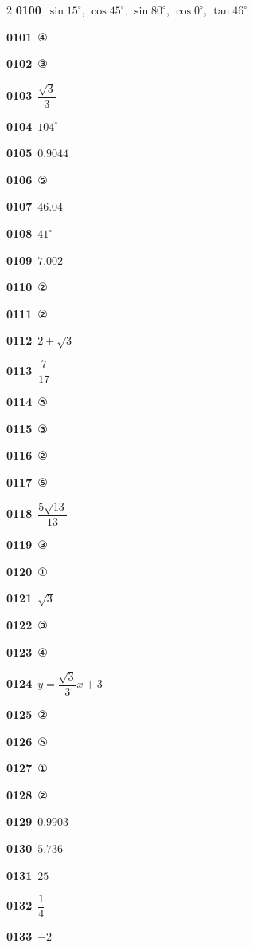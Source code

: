 \documentclass[10pt,a4paper]{article}
\begin{document}
\begin{multicols}{2}
\noindent\textbf{0100}\ $\sin 15^\circ$, $\cos 45^\circ$, $\sin 80^\circ$, $\cos 0^\circ$, $\tan 46^\circ$\par
\noindent\textbf{0101}\ ④\par
\noindent\textbf{0102}\ ③\par
\noindent\textbf{0103}\ $\dfrac{\sqrt{3}}{3}$\par
\noindent\textbf{0104}\ $104^\circ$\par
\noindent\textbf{0105}\ $0.9044$\par
\noindent\textbf{0106}\ ⑤\par
\noindent\textbf{0107}\ $46.04$\par
\noindent\textbf{0108}\ $41^\circ$\par
\noindent\textbf{0109}\ $7.002$\par
\noindent\textbf{0110}\ ②\par
\noindent\textbf{0111}\ ②\par
\noindent\textbf{0112}\ $2+\sqrt{3}$\par
\noindent\textbf{0113}\ $\dfrac{7}{17}$\par
\noindent\textbf{0114}\ ⑤\par
\noindent\textbf{0115}\ ③\par
\noindent\textbf{0116}\ ②\par
\noindent\textbf{0117}\ ⑤\par
\noindent\textbf{0118}\ $\dfrac{5\sqrt{13}}{13}$\par
\noindent\textbf{0119}\ ③\par
\noindent\textbf{0120}\ ①\par
\noindent\textbf{0121}\ $\sqrt{3}$\par
\noindent\textbf{0122}\ ③\par
\noindent\textbf{0123}\ ④\par
\noindent\textbf{0124}\ $y=\dfrac{\sqrt{3}}{3}x+3$\par
\noindent\textbf{0125}\ ②\par
\noindent\textbf{0126}\ ⑤\par
\noindent\textbf{0127}\ ①\par
\noindent\textbf{0128}\ ②\par
\noindent\textbf{0129}\ $0.9903$\par
\noindent\textbf{0130}\ $5.736$\par
\noindent\textbf{0131}\ $25$\par
\noindent\textbf{0132}\ $\dfrac{1}{4}$\par
\noindent\textbf{0133}\ $-2$\par

\end{multicols}
\end{document}
